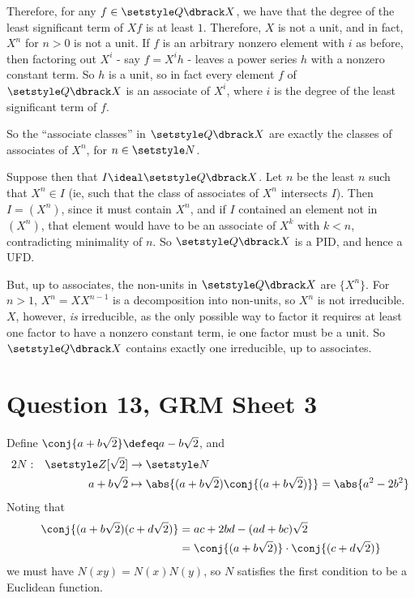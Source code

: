 \documentclass[fleqn,a4paper,11pt]{article}
\begin{document}
Therefore, for any \(f \in \Q\dbrack X\), we have that the degree of the least
significant term of \(Xf\) is at least \(1\). Therefore, \(X\) is not a unit,
and in fact, \(X^n\) for \(n > 0\) is not a unit. If \(f\) is an arbitrary
nonzero element with \(i\) as before, then factoring out \(X^i\) - say
\(f = X^i h\) - leaves a power series \(h\) with a nonzero constant term. So
\(h\) is a unit, so in fact every element \(f\) of \(\Q\dbrack X\) is an
associate of \(X^i\), where \(i\) is the degree of the least significant term of
\(f\).

So the ``associate classes'' in \(\Q\dbrack X\) are exactly the classes of
associates of \(X^n\), for \(n \in \N\).

Suppose then that \(I \ideal \Q\dbrack X\). Let \(n\) be the least \(n\) such
that \(X^n \in I\) (ie, such that the class of associates of \(X^n\) intersects
\(I\)). Then \(I = (X^n)\), since it must contain \(X^n\), and if
\(I\) contained an element not in \((X^n)\), that element would have to be an
associate of \(X^k\) with \(k < n\), contradicting minimality of \(n\). So
\(\Q\dbrack X\) is a PID, and hence a UFD.

But, up to associates, the non-units in \(\Q\dbrack X\) are \(\{X^n\}\). For
\(n > 1\), \(X^n = X X^{n - 1}\) is a decomposition into non-units, so \(X^n\)
is not irreducible. \(X\), however, \emph{is} irreducible, as the only possible
way to factor it requires at least one factor to have a nonzero constant term,
ie one factor must be a unit. So \(\Q\dbrack X\) contains exactly one
irreducible, up to associates.

\section{Question 13, GRM Sheet 3}

Define \(\conj{a + b\sqrt 2} \defeq a - b\sqrt 2\), and
\begin{alignat*}2
 N :&& \Z[\sqrt 2] &\to \N \\
     &&a + b\sqrt 2 &\mapsto
         \abs{(a + b \sqrt 2)\conj{(a + b\sqrt 2)}}
         = \abs{a^2 - 2b^2}
\end{alignat*}
Noting that
\begin{align*}
 \conj{(a + b\sqrt 2)(c + d\sqrt 2)}
 &= ac + 2bd - (ad + bc)\sqrt 2 \\
 &= \conj{(a + b\sqrt 2)} \cdot \conj{(c + d\sqrt 2)}
\end{align*}
we must have \(N(xy) = N(x)N(y)\), so \(N\) satisfies the first condition to be
a Euclidean function.
\end{document}
